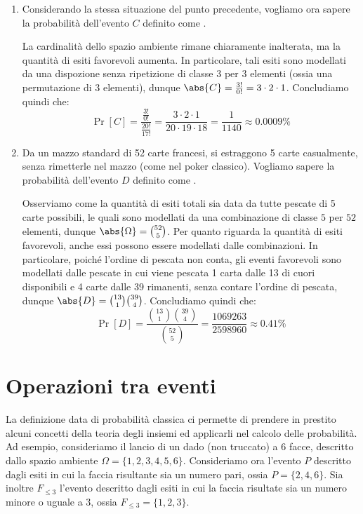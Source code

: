 \documentclass[a4paper, 12pt]{report}
\begin{document}
\begin{enumerate}
        \item Considerando la stessa situazione del punto precedente, vogliamo ora sapere la probabilità dell'evento $C$ definito come .
        
        La cardinalità dello spazio ambiente rimane chiaramente inalterata, ma la quantità di esiti favorevoli aumenta. In particolare, tali esiti sono modellati da una dispozione senza ripetizione di classe $3$ per $3$ elementi (ossia una permutazione di $3$ elementi), dunque $\abs{C} = \frac{3!}{0!} = 3 \cdot 2 \cdot 1$. Concludiamo quindi che: 
        \[\Pr[C] = \frac{\frac{3!}{0!}}{\frac{20!}{17!}} = \frac{3 \cdot 2 \cdot 1}{20 \cdot 19 \cdot 18} = \frac{1}{1140} \approx 0.0009\%\]

        \item Da un mazzo standard di 52 carte francesi, si estraggono 5 carte casualmente, senza rimetterle nel mazzo (come nel poker classico). Vogliamo sapere la probabilità dell'evento $D$ definito come .
        
        Osserviamo come la quantità di esiti totali sia data da tutte pescate di 5 carte possibili, le quali sono modellati da una combinazione di classe $5$ per $52$ elementi, dunque $\abs{\Omega} = \binom{52}{5}$. Per quanto riguarda la quantità di esiti favorevoli, anche essi  possono essere modellati dalle combinazioni. In particolare, poiché l'ordine di pescata non conta, gli eventi favorevoli sono modellati dalle pescate in cui viene pescata 1 carta dalle 13 di cuori disponibili e 4 carte dalle 39 rimanenti, senza contare l'ordine di pescata, dunque $\abs{D} = \binom{13}{1} \binom{39}{4}$. Concludiamo quindi che: 
        \[\Pr[D] = \frac{\binom{13}{1} \binom{39}{4}}{\binom{52}{5}} = \frac{1069263}{2598960} \approx 0.41\%\]
    \end{enumerate}

    \section{Operazioni tra eventi}

    La definizione data di probabilità classica ci permette di prendere in prestito alcuni concetti della teoria degli insiemi ed applicarli nel calcolo delle probabilità. Ad esempio, consideriamo il lancio di un dado (non truccato) a 6 facce,  descritto dallo spazio ambiente $\Omega = \{1,2,3,4,5,6\}$. Consideriamo ora l'evento $P$ descritto dagli esiti in cui la faccia risultante sia un numero pari, ossia $P = \{2,4,6\}$. Sia inoltre $F_{\leq 3}$ l'evento descritto dagli esiti in cui la faccia risultate sia un numero minore o uguale a 3, ossia $F_{\leq 3} = \{1,2,3\}$.
\end{document}

